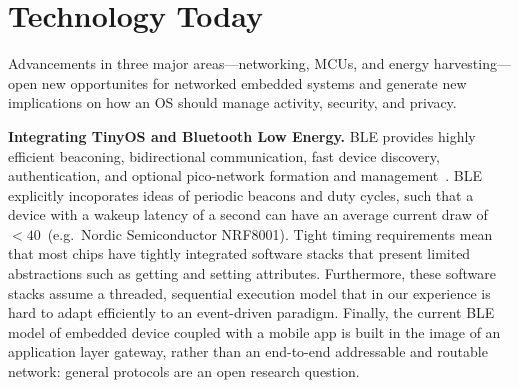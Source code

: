\section{Technology Today}
Advancements in three major areas---networking, MCUs, and energy
harvesting---open new opportunites for networked embedded systems and generate
new implications on how an OS should manage activity, security, and privacy.


\smallskip\noindent
\textbf{Integrating TinyOS and Bluetooth Low Energy.}
BLE provides highly efficient beaconing,
bidirectional communication, fast device discovery, authentication, and
optional pico-network formation and management~\cite{ble-overview}.
BLE explicitly incoporates ideas of periodic beacons and duty cycles,
such that a device with a wakeup latency of a second can have
an average current draw of $< 40$~\uA (e.g.\ Nordic Semiconductor NRF8001).
%
Tight timing requirements mean that most chips have tightly
integrated software stacks that present limited abstractions such as
getting and setting attributes. Furthermore, these software stacks
assume a threaded, sequential execution model that in our experience
is hard to adapt efficiently to an event-driven paradigm. 
%
Finally, the current BLE model of embedded device coupled with a
mobile app is built in the image of an application layer gateway,
rather than an end-to-end addressable and routable network:
general protocols are an open research question.



